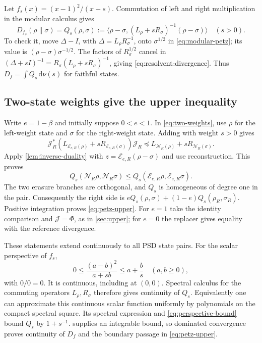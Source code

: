 \documentclass[11pt]{article}
\numberwithin{equation}{section}
\theoremstyle{definition}
\theoremstyle{remark}
\newcommand{\N}{\mathcal N}
\newcommand{\E}{\mathcal E}
\newcommand{\ip}[2]{\langle #1,#2\rangle}
\newcommand{\dd}{\,\mathrm d}
\begin{document}
Let $f_s(x)=(x-1)^2/(x+s)$. Commutation of left and right multiplication
in the modular calculus gives
\begin{equation}
 D_{f_s}(\rho\|\sigma)
 =Q_s(\rho,\sigma):=
 \ip{\rho-\sigma}{(L_\rho+sR_\sigma)^{-1}(\rho-\sigma)}
 \quad(s>0).
 \label{eq:resolvent-divergence}
\end{equation}
To check it, move $\Delta-I$, with $\Delta=L_\rho R_\sigma^{-1}$,
onto $\sigma^{1/2}$ in \eqref{eq:modular-petz}; its value is
$(\rho-\sigma)\sigma^{-1/2}$. The factors of $R_\sigma^{1/2}$
cancel in $(\Delta+sI)^{-1}
=R_\sigma(L_\rho+sR_\sigma)^{-1}$, giving
\eqref{eq:resolvent-divergence}. Thus
$D_f=\int Q_s\dd\nu(s)$ for faithful states.

\subsection{Two-state weights give the upper inequality}

Write $e=1-\beta$ and initially suppose $0<e<1$.
In \eqref{eq:two-weights}, use $\rho$ for the left-weight state
and $\sigma$ for the right-weight state. Adding with weight $s>0$
gives
\[
 \mathcal J_R^*
 (L_{\E_{e,R}(\rho)}+sR_{\E_{e,R}(\sigma)})\mathcal J_R
 \preceq L_{\N_R(\rho)}+sR_{\N_R(\sigma)}.
\]
Apply \cref{lem:inverse-duality} with
$z=\E_{e,R}(\rho-\sigma)$ and use reconstruction. This proves
\[
 Q_s(\N_R\rho,\N_R\sigma)
 \leq Q_s(\E_{e,R}\rho,\E_{e,R}\sigma).
\]
The two erasure branches are orthogonal, and $Q_s$ is homogeneous of
degree one in the pair. Consequently the right side is
$eQ_s(\rho,\sigma)+(1-e)Q_s(\rho_R,\sigma_R)$.
Positive integration proves \eqref{eq:petz-upper}.
For $e=1$ take the identity comparison and $\mathcal J=\Phi$, as in
\cref{sec:upper}; for $e=0$ the replacer gives equality with the
reference divergence.

These statements extend continuously to all PSD state pairs.
For the scalar perspective of $f_s$,
\begin{equation}
 0\leq\frac{(a-b)^2}{a+sb}\leq a+\frac bs
 \quad(a,b\geq0),
 \label{eq:perspective-bound}
\end{equation}
with $0/0=0$. It is continuous, including at $(0,0)$.
Spectral calculus for the commuting operators $L_\rho,R_\sigma$
therefore gives continuity of $Q_s$. Equivalently one can approximate
this continuous scalar function uniformly by polynomials on the
compact spectral square. Its spectral expression and
\eqref{eq:perspective-bound} bound $Q_s$ by $1+s^{-1}$.
 supplies an integrable bound, so
dominated convergence proves continuity of $D_f$ and the boundary
passage in \eqref{eq:petz-upper}.
\end{document}
